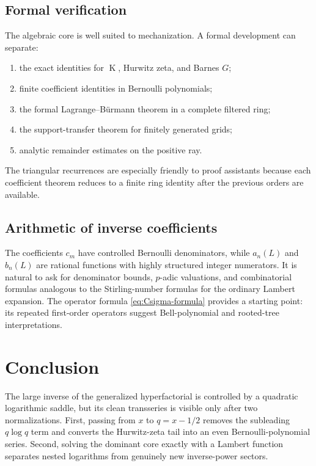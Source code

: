 \documentclass[11pt,oneside]{article}
\theoremstyle{plain}
\theoremstyle{definition}
\theoremstyle{remark}
\newcommand{\Kfun}{\operatorname{K}}
\begin{document}
\subsection{Formal verification}

The algebraic core is well suited to mechanization.  A formal development can
separate:
\begin{enumerate}
\item the exact identities for \(\Kfun\), Hurwitz zeta, and Barnes \(G\);
\item finite coefficient identities in Bernoulli polynomials;
\item the formal Lagrange--B\"urmann theorem in a complete filtered ring;
\item the support-transfer theorem for finitely generated grids;
\item analytic remainder estimates on the positive ray.
\end{enumerate}
The triangular recurrences are especially friendly to proof assistants because
each coefficient theorem reduces to a finite ring identity after the previous
orders are available.

\subsection{Arithmetic of inverse coefficients}

The coefficients \(c_m\) have controlled Bernoulli denominators, while
\(a_n(L)\) and \(b_n(L)\) are rational functions with highly structured integer
numerators.  It is natural to ask for denominator bounds, \(p\)-adic valuations,
and combinatorial formulas analogous to the Stirling-number formulas for the
ordinary Lambert expansion.  The operator formula
\eqref{eq:Csigma-formula} provides a starting point: its repeated first-order
operators suggest Bell-polynomial and rooted-tree interpretations.

\section{Conclusion}
\label{sec:conclusion}

The large inverse of the generalized hyperfactorial is controlled by a
quadratic logarithmic saddle, but its clean transseries is visible only after
two normalizations.  First, passing from \(x\) to \(q=x-1/2\) removes the
subleading \(q\log q\) term and converts the Hurwitz-zeta tail into an even
Bernoulli-polynomial series.  Second, solving the dominant core exactly with a
Lambert function separates nested logarithms from genuinely new inverse-power
sectors.
\end{document}
